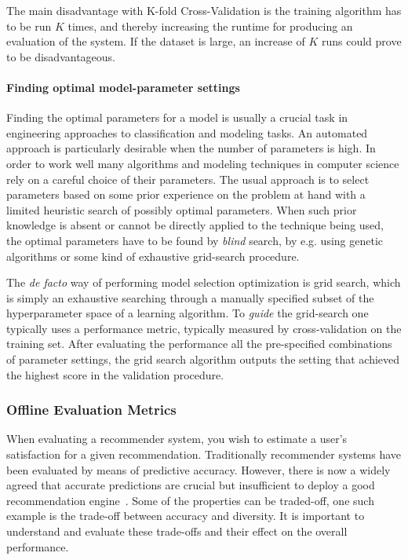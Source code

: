 The main disadvantage with K-fold Cross-Validation is the training algorithm
has to be run $K$ times, and thereby increasing the runtime for producing an
evaluation of the system. If the dataset is large, an increase of $K$ runs
could prove to be disadvantageous.

\paragraph{Finding optimal model-parameter settings}
Finding the optimal parameters for a model is usually a crucial task in
engineering approaches to classification and modeling tasks. An automated
approach is particularly desirable when the number of parameters is high. In
order to work well many algorithms and modeling techniques in computer science
rely on a careful choice of their parameters. The usual approach is to select
parameters based on some prior experience on the problem at hand with a limited
heuristic search of possibly optimal parameters. When such prior knowledge is
absent or cannot be directly applied to the technique being used, the optimal
parameters have to be found by \emph{blind} search, by e.g. using genetic
algorithms or some kind of exhaustive grid-search procedure.

The \emph{de facto} way of performing model selection optimization is grid
search, which is simply an exhaustive searching through a manually specified
subset of the hyperparameter space of a learning algorithm. To \emph{guide} the
grid-search one typically uses a performance metric, typically measured by
cross-validation on the training set. After evaluating the performance all the
pre-specified combinations of parameter settings, the grid search algorithm
outputs the setting that achieved the highest score in the validation
procedure.

\subsubsection{Offline Evaluation Metrics}

When evaluating a recommender system, you wish to estimate a user's
satisfaction for a given recommendation. Traditionally recommender systems have
been evaluated by means of predictive accuracy. However, there is now a widely
agreed that accurate predictions are crucial but insufficient to deploy a good
recommendation engine~\cite{Shani2011, McNee2006}. Some of the properties can
be traded-off, one such example is the trade-off between accuracy and
diversity. It is important to understand and evaluate these trade-offs and
their effect on the overall performance.

